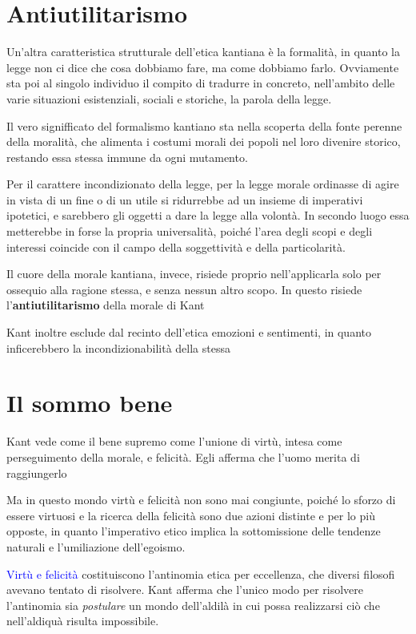 \documentclass[a4paper, twoside, titlepage]{book}
\renewcommand{\emph}[1]{\textcolor{blue}{#1}}
\begin{document}
\section{Antiutilitarismo}

Un’altra caratteristica strutturale dell’etica kantiana è la formalità, in quanto la legge non ci dice che cosa dobbiamo fare, ma come dobbiamo farlo.
Ovviamente sta poi al singolo individuo il compito di tradurre in concreto, nell’ambito delle varie situazioni esistenziali, sociali e storiche, la parola della legge.

Il vero signifficato del formalismo kantiano sta nella scoperta della fonte perenne della moralità, che alimenta i costumi morali dei popoli nel loro divenire storico, restando essa stessa immune da ogni mutamento.

Per il carattere incondizionato della legge, per la legge morale ordinasse di agire in vista di un fine o di un utile si ridurrebbe ad un insieme di imperativi ipotetici, e sarebbero gli oggetti a dare la legge alla volontà. In secondo luogo essa metterebbe in forse la propria universalità, poiché l’area degli scopi e degli interessi coincide con il campo della soggettività e della particolarità.

Il cuore della morale kantiana, invece, risiede proprio nell’applicarla solo per ossequio alla ragione stessa, e senza nessun altro scopo. In questo risiede l’\textbf{antiutilitarismo} della morale di Kant

Kant inoltre esclude dal recinto dell’etica emozioni e sentimenti, in quanto inficerebbero la incondizionabilità della stessa

\section{Il sommo bene}

Kant vede come il bene supremo come l’unione di virtù, intesa come perseguimento della morale, e felicità. Egli afferma che l’uomo merita di raggiungerlo

Ma in questo mondo virtù e felicità non sono mai congiunte, poiché lo sforzo di essere virtuosi e la ricerca della felicità sono due azioni distinte e per lo più opposte, in quanto l’imperativo etico implica la sottomissione delle tendenze naturali e l’umiliazione dell’egoismo.

\emph{Virtù e felicità} costituiscono l’antinomia etica per eccellenza, che diversi filosofi avevano tentato di risolvere. Kant afferma che l’unico modo per risolvere l’antinomia sia \textit{postulare} un mondo dell’aldilà in cui possa realizzarsi ciò che nell’aldiquà risulta impossibile.
\end{document}

